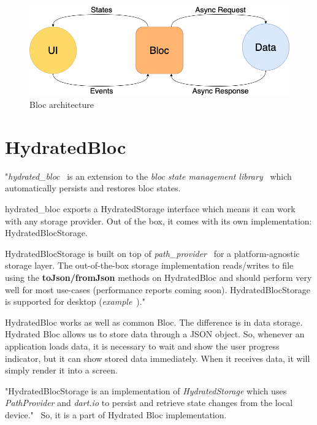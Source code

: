 \begin{figure}
    \centering
    \includegraphics[scale=0.4]{assets/bloc_architecture.png}
    \caption{Bloc architecture~\cite{bloc}}
    \label{fig:bloc-architecture}
\end{figure}

\section{HydratedBloc}\label{sec:hydratedbloc}
"\textit{hydrated\_bloc}~\cite{hydratedBlocPubDev} is an extension to the \textit{bloc state management library}~\cite{bloc} which automatically persists and restores bloc states.

hydrated\_bloc exports a HydratedStorage interface which means it can work with any storage provider.
Out of the box, it comes with its own implementation: HydratedBlocStorage.

HydratedBlocStorage is built on top of \textit{path\_provider}~\cite{pathProvider} for a platform-agnostic storage layer.
The out-of-the-box storage implementation reads/writes to file using the \textbf{toJson/fromJson} methods on HydratedBloc and should perform very well for most use-cases (performance reports coming soon).
HydratedBlocStorage is supported for desktop (\textit{example}~\cite{hydratedBlocExample})."~\cite{hydratedBlocTut}

HydratedBloc works as well as common Bloc.
The difference is in data storage.
Hydrated Bloc allows us to store data through a JSON object.
So, whenever an application loads data, it is necessary to wait and show the user progress indicator, but it can show stored data immediately.
When it receives data, it will simply render it into a screen.

"HydratedBlocStorage is an implementation of \textit{HydratedStorage} which uses \textit{PathProvider} and \textit{dart.io} to persist and retrieve state changes from the local device."~\cite{hydratedBlocStorage}
So, it is a part of Hydrated Bloc implementation.